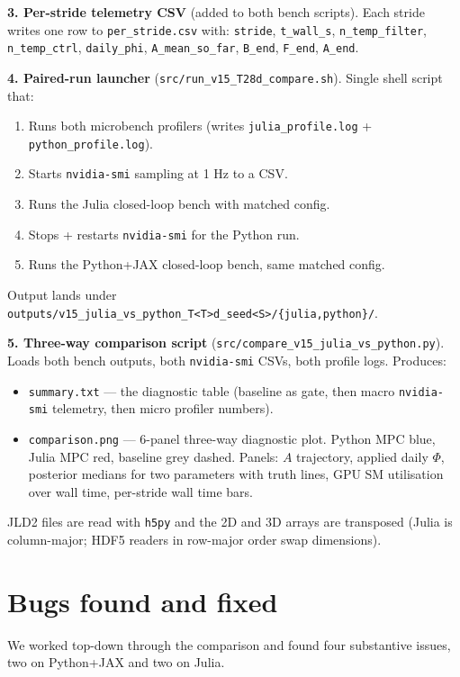 \documentclass[11pt,a4paper]{article}
\begin{document}
\textbf{3. Per-stride telemetry CSV} (added to both bench
scripts). Each stride writes one row to \texttt{per\_stride.csv}
with: \texttt{stride}, \texttt{t\_wall\_s},
\texttt{n\_temp\_filter}, \texttt{n\_temp\_ctrl},
\texttt{daily\_phi}, \texttt{A\_mean\_so\_far}, \texttt{B\_end},
\texttt{F\_end}, \texttt{A\_end}.

\textbf{4. Paired-run launcher}
(\texttt{src/run\_v15\_T28d\_compare.sh}). Single shell script
that:
\begin{enumerate}[itemsep=2pt]
  \item Runs both microbench profilers (writes
        \texttt{julia\_profile.log} + \texttt{python\_profile.log}).
  \item Starts \texttt{nvidia-smi} sampling at 1 Hz to a CSV.
  \item Runs the Julia closed-loop bench with matched config.
  \item Stops + restarts \texttt{nvidia-smi} for the Python run.
  \item Runs the Python+JAX closed-loop bench, same matched config.
\end{enumerate}
Output lands under
\texttt{outputs/v15\_julia\_vs\_python\_T<T>d\_seed<S>/\{julia,python\}/}.

\textbf{5. Three-way comparison script}
(\texttt{src/compare\_v15\_julia\_vs\_python.py}). Loads both
bench outputs, both \texttt{nvidia-smi} CSVs, both profile logs.
Produces:
\begin{itemize}[itemsep=2pt]
  \item \texttt{summary.txt} --- the diagnostic table (baseline as
        gate, then macro \texttt{nvidia-smi} telemetry, then micro
        profiler numbers).
  \item \texttt{comparison.png} --- 6-panel three-way diagnostic
        plot. Python MPC blue, Julia MPC red, baseline grey
        dashed. Panels: $A$ trajectory, applied daily $\Phi$,
        posterior medians for two parameters with truth lines,
        GPU SM utilisation over wall time, per-stride wall time
        bars.
\end{itemize}
JLD2 files are read with \texttt{h5py} and the 2D and 3D arrays are
transposed (Julia is column-major; HDF5 readers in row-major order
swap dimensions).

\section{Bugs found and fixed}

We worked top-down through the comparison and found four
substantive issues, two on Python+JAX and two on Julia.
\end{document}
